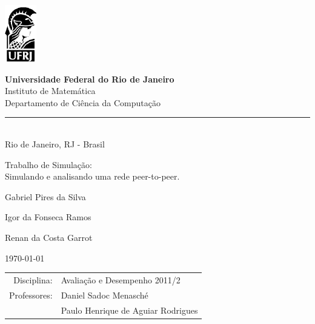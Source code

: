 \documentclass[a4paper,10pt]{article}
\begin{document}
\begin{titlepage}

\begin{minipage}{0.2\linewidth}
 \includegraphics[]{./minerva.png}
\end{minipage}
\begin{minipage}{0.8\linewidth}
 \textbf{Universidade Federal do Rio de Janeiro}\\
 Instituto de Matemática\\
 Departamento de Ciência da Computação\\
 \rule{0.8\linewidth}{0.5mm}\\
 Rio de Janeiro, RJ - Brasil
\end{minipage}

\begin{center}

\vspace{2cm}

\Large
Trabalho de Simulação:\\ Simulando e analisando uma rede peer-to-peer.

\vspace{1cm}

\large

Gabriel Pires da Silva

\vspace{0.5cm}

Igor da Fonseca Ramos

\vspace{0.5cm}

Renan da Costa Garrot

\vspace{2.5cm}

\today

\normalsize
\end{center}

\vfill

\begin{flushright}
\begin{tabular}{rl}
Disciplina: & Avaliação e Desempenho 2011/2\\
Professores: & Daniel Sadoc Menasché\\
 & Paulo Henrique de Aguiar Rodrigues\\
\end{tabular}
\end{flushright}

\vspace{2cm}

\end{titlepage}
\end{document}
